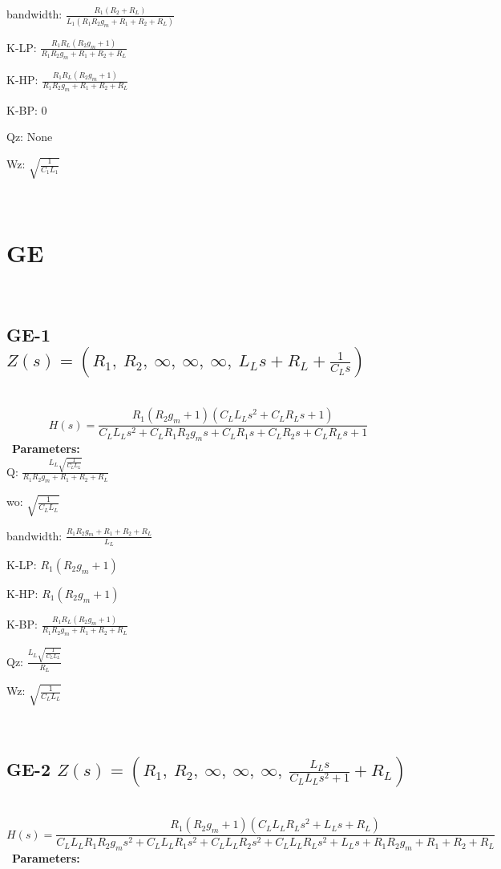 \documentclass{article}
\begin{document}
bandwidth: $\frac{R_{1} \left(R_{2} + R_{L}\right)}{L_{1} \left(R_{1} R_{2} g_{m} + R_{1} + R_{2} + R_{L}\right)}$\ 

K-LP: $\frac{R_{1} R_{L} \left(R_{2} g_{m} + 1\right)}{R_{1} R_{2} g_{m} + R_{1} + R_{2} + R_{L}}$\ 

K-HP: $\frac{R_{1} R_{L} \left(R_{2} g_{m} + 1\right)}{R_{1} R_{2} g_{m} + R_{1} + R_{2} + R_{L}}$\ 

K-BP: $0$\ 

Qz: $\text{None}$\ 

Wz: $\sqrt{\frac{1}{C_{1} L_{1}}}$\ 

\ 

\section{GE}\ 
\subsection{GE-1 $Z(s) = \left( R_{1}, \  R_{2}, \  \infty, \  \infty, \  \infty, \  L_{L} s + R_{L} + \frac{1}{C_{L} s}\right)$ } \ 
\textbf{\[H(s) = \frac{R_{1} \left(R_{2} g_{m} + 1\right) \left(C_{L} L_{L} s^{2} + C_{L} R_{L} s + 1\right)}{C_{L} L_{L} s^{2} + C_{L} R_{1} R_{2} g_{m} s + C_{L} R_{1} s + C_{L} R_{2} s + C_{L} R_{L} s + 1}\] } \ 
\textbf{Parameters:}\\ 

Q: $\frac{L_{L} \sqrt{\frac{1}{C_{L} L_{L}}}}{R_{1} R_{2} g_{m} + R_{1} + R_{2} + R_{L}}$\ 

wo: $\sqrt{\frac{1}{C_{L} L_{L}}}$\ 

bandwidth: $\frac{R_{1} R_{2} g_{m} + R_{1} + R_{2} + R_{L}}{L_{L}}$\ 

K-LP: $R_{1} \left(R_{2} g_{m} + 1\right)$\ 

K-HP: $R_{1} \left(R_{2} g_{m} + 1\right)$\ 

K-BP: $\frac{R_{1} R_{L} \left(R_{2} g_{m} + 1\right)}{R_{1} R_{2} g_{m} + R_{1} + R_{2} + R_{L}}$\ 

Qz: $\frac{L_{L} \sqrt{\frac{1}{C_{L} L_{L}}}}{R_{L}}$\ 

Wz: $\sqrt{\frac{1}{C_{L} L_{L}}}$\ 

\ 

\subsection{GE-2 $Z(s) = \left( R_{1}, \  R_{2}, \  \infty, \  \infty, \  \infty, \  \frac{L_{L} s}{C_{L} L_{L} s^{2} + 1} + R_{L}\right)$ } \ 
\textbf{\[H(s) = \frac{R_{1} \left(R_{2} g_{m} + 1\right) \left(C_{L} L_{L} R_{L} s^{2} + L_{L} s + R_{L}\right)}{C_{L} L_{L} R_{1} R_{2} g_{m} s^{2} + C_{L} L_{L} R_{1} s^{2} + C_{L} L_{L} R_{2} s^{2} + C_{L} L_{L} R_{L} s^{2} + L_{L} s + R_{1} R_{2} g_{m} + R_{1} + R_{2} + R_{L}}\] } \ 
\textbf{Parameters:}\\ 
\end{document}

